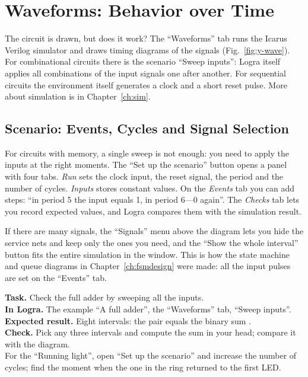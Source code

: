 \section{Waveforms: Behavior over Time}

The circuit is drawn, but does it work? The ``Waveforms'' tab runs the
Icarus Verilog simulator and draws timing diagrams of the signals
(Fig.~\ref{fig:y-wave}). For combinational circuits there is the scenario ``Sweep
inputs'': Logra itself applies all combinations of the input signals one after another. For
sequential circuits the environment itself generates a clock and a short reset pulse.
More about simulation is in Chapter~\ref{ch:sim}.


\subsection{Scenario: Events, Cycles and Signal Selection}

For circuits with memory, a single sweep is not enough: you need to apply the inputs at the right
moments. The ``Set up the scenario'' button opens a panel with four tabs.
\emph{Run} sets the clock input, the reset signal, the period and the number of cycles.
\emph{Inputs} stores constant values. On the \emph{Events} tab you can
add steps: ``in period 5 the input  equals 1, in period 6---0 again''.
The \emph{Checks} tab lets you record expected values, and Logra
compares them with the simulation result.

If there are many signals, the ``Signals'' menu above the diagram lets you hide
the service nets and keep only the ones you need, and the ``Show the whole interval'' button
fits the entire simulation in the window. This is how the state machine and queue diagrams
in Chapter~\ref{ch:fsmdesign} were made: all the input pulses are set on the ``Events'' tab.

\begin{diybox}
\textbf{Task.} Check the full adder by sweeping all the inputs.\\
\textbf{In Logra.} The example ``A full adder'', the ``Waveforms'' tab, ``Sweep
inputs''.\\
\textbf{Expected result.} Eight intervals: the pair  equals the
binary sum .\\
\textbf{Check.} Pick any three intervals and compute the sum in your head;
compare it with the diagram.\\
 For the ``Running light'', open ``Set up the scenario'' and increase the
number of cycles; find the moment when the one in the ring returned to the first
LED.
\end{diybox}


